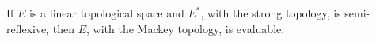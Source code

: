 If $E$ is a linear topological space and $E^{*}$, with the strong topology, is semi-reflexive, then $E$, with the Mackey topology, is evaluable.
